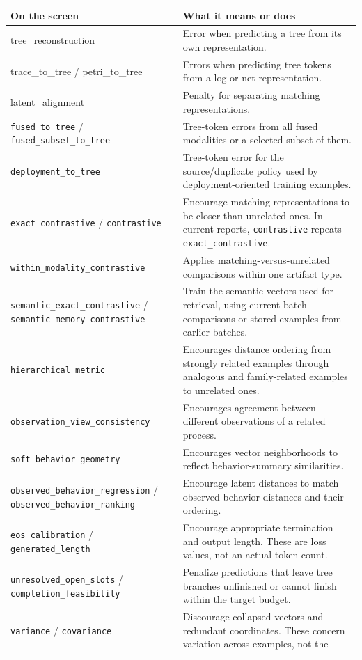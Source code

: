 \documentclass[11pt,a4paper]{article}
\makeatletter
\newcommand{\code}[1]{\nolinkurl{#1}}
\newenvironment{controls}{%
  \small\begin{longtable}{@{}>{\raggedright\arraybackslash}p{.34\linewidth}
    >{\raggedright\arraybackslash}p{.62\linewidth}@{}}
  \toprule\textbf{On the screen} & \textbf{What it means or does}\\\midrule\endhead
  \bottomrule\endfoot
}{\end{longtable}\normalsize}
\makeatother
\begin{document}
\begin{controls}
tree\_reconstruction & Error when predicting a tree from its own representation.\\
trace\_to\_tree / petri\_to\_tree & Errors when predicting tree tokens from
a log or net representation.\\
latent\_alignment & Penalty for separating matching representations.\\
\code{fused_to_tree} / \code{fused_subset_to_tree} & Tree-token errors from
all fused modalities or a selected subset of them.\\
\code{deployment_to_tree} & Tree-token error for the source/duplicate policy
used by deployment-oriented training examples.\\
\code{exact_contrastive} / \code{contrastive} & Encourage matching
representations to be closer than unrelated ones. In current reports,
\code{contrastive} repeats \code{exact_contrastive}.\\
\code{within_modality_contrastive} & Applies matching-versus-unrelated
comparisons within one artifact type.\\
\code{semantic_exact_contrastive} / \code{semantic_memory_contrastive} &
Train the semantic vectors used for retrieval, using current-batch comparisons
or stored examples from earlier batches.\\
\code{hierarchical_metric} & Encourages distance ordering from strongly related
examples through analogous and family-related examples to unrelated ones.\\
\code{observation_view_consistency} & Encourages agreement between different
observations of a related process.\\
\code{soft_behavior_geometry} & Encourages vector neighborhoods to reflect
behavior-summary similarities.\\
\code{observed_behavior_regression} / \code{observed_behavior_ranking} &
Encourage latent distances to match observed behavior distances and their
ordering.\\
\code{eos_calibration} / \code{generated_length} & Encourage appropriate
termination and output length. These are loss values, not an actual token count.\\
\code{unresolved_open_slots} / \code{completion_feasibility} & Penalize
predictions that leave tree branches unfinished or cannot finish within the
target budget.\\
\code{variance} / \code{covariance} & Discourage collapsed vectors and
redundant coordinates. These concern variation across examples, not the

\end{controls}
\end{document}
